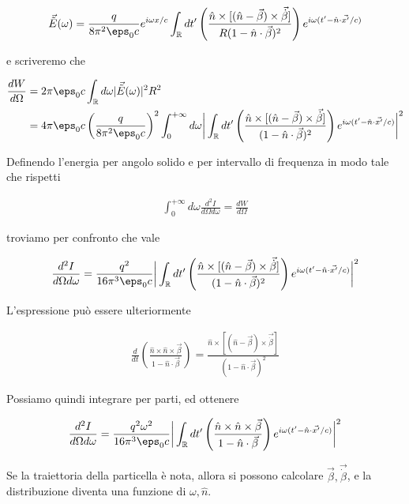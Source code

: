 \documentclass{report}
\begin{document}
\begin{align}
    \vec{\tilde{E}}(\omega) = \frac{q}{8\pi^2 \eps_0 c} e^{i\omega x/c}\int_{\mathbb{R}} dt' \left(\frac{\hat{n}\times [(\hat{n}-\vec{\beta})\times \vec{\dot{\beta}}]}{R(1-\hat{n}\cdot \vec{\beta})^2} \right)e^{i\omega(t' - \hat{n}\cdot \vec{x'}/c)} 
\end{align}


e scriveremo che 

\begin{align}
    \frac{dW}{d\Omega } &= 2\pi \eps_0 c \int_{\mathbb{R}} d\omega |\vec{\tilde{E}}(\omega)|^2 R^2 \\
    &= 4\pi \eps_0 c \left(\frac{q}{8\pi^2 \eps_0 c} \right)^2 \int_0^{+\infty}  d\omega \biggr|\int_{\mathbb{R}} dt' \left(\frac{\hat{n}\times [(\hat{n}-\vec{\beta})\times \vec{\dot{\beta}}]}{(1-\hat{n}\cdot \vec{\beta})^2} \right)e^{i\omega(t' - \hat{n}\cdot \vec{x'}/c)} \biggr|^2
\end{align}

Definendo l'energia per angolo solido e per intervallo di frequenza in modo tale che rispetti 

\begin{align}
    \int_0^{+\infty} d\omega \frac{d^2 I}{d\Omega d\omega} = \frac{dW}{d\Omega}
\end{align}

troviamo per confronto che vale 

\begin{align}
    \frac{d^2I}{d\Omega d\omega} = \frac{q^2}{16\pi^3 \eps_0 c} \biggr|\int_{\mathbb{R}} dt' \left(\frac{\hat{n}\times [(\hat{n}-\vec{\beta})\times \vec{\dot{\beta}}]}{(1-\hat{n}\cdot \vec{\beta})^2} \right)e^{i\omega(t' - \hat{n}\cdot \vec{x'}/c)} \biggr|^2
\end{align}

L'espressione può essere ulteriormente 

\begin{align}
    \frac{d}{dt}\left(\frac{\hat{n}\times \hat{n}\times \vec{\beta}}{1 - \hat{n}\cdot \vec{\beta}} \right) = \frac{\hat{n}\times [(\hat{n}-\vec{\beta})\times \vec{\dot{\beta}}]}{(1-\hat{n}\cdot \vec{\beta})^2}
\end{align}

Possiamo quindi integrare per parti, ed ottenere 

\begin{tcolorbox}[colback=doc!15, colframe=black, boxrule=1pt]
\begin{align}
    \frac{d^2I}{d\Omega d\omega} = \frac{q^2 \omega^2}{16\pi^3\eps_0 c} \biggr|\int_{\mathbb{R}} dt' \left(\frac{\hat{n}\times \hat{n}\times \vec{\beta}}{1 - \hat{n}\cdot \vec{\beta}} \right)e^{i\omega(t' - \hat{n}\cdot \vec{x'}/c)} \biggr|^2 
\end{align}
\end{tcolorbox}

Se la traiettoria della particella è nota, allora si possono calcolare \(\vec{\beta}, \vec{\dot{\beta}}\), e la distribuzione diventa una funzione di \(\omega, \hat{n}\). 
\end{document}
